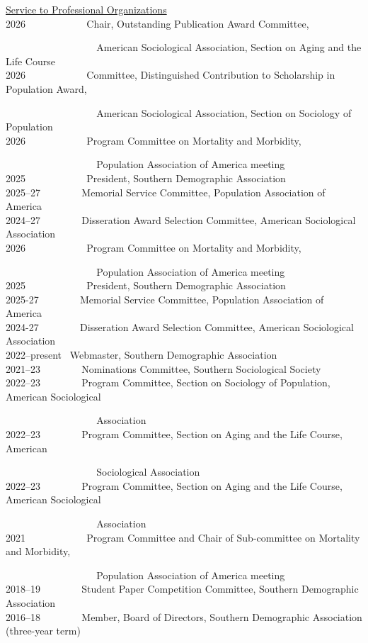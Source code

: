 \documentclass[11pt,]{article}
\begin{document}
\underline{Service to Professional Organizations}\\
2026 ~ ~ ~ ~ ~ ~ ~ Chair, Outstanding Publication Award Committee,\\
\strut ~ ~ ~ ~ ~ ~ ~ ~ ~ ~ ~ American Sociological Association, Section
on Aging and the Life Course\\
2026 ~ ~ ~ ~ ~ ~ ~ Committee, Distinguished Contribution to Scholarship
in Population Award,\\
\strut ~ ~ ~ ~ ~ ~ ~ ~ ~ ~ ~ American Sociological Association, Section
on Sociology of Population\\
2026 ~ ~ ~ ~ ~ ~ ~ Program Committee on Mortality and Morbidity,\\
\strut ~ ~ ~ ~ ~ ~ ~ ~ ~ ~ ~ Population Association of America meeting\\
2025 ~ ~ ~ ~ ~ ~ ~ President, Southern Demographic Association\\
2025--27 ~ ~ ~ ~ ~Memorial Service Committee, Population Association of
America\\
2024--27 ~ ~ ~ ~ ~Disseration Award Selection Committee, American
Sociological Association\\
2026 ~ ~ ~ ~ ~ ~ ~ Program Committee on Mortality and Morbidity,\\
\strut ~ ~ ~ ~ ~ ~ ~ ~ ~ ~ ~ Population Association of America meeting\\
2025 ~ ~ ~ ~ ~ ~ ~ President, Southern Demographic Association\\
2025-27 ~ ~ ~ ~ ~Memorial Service Committee, Population Association of
America\\
2024-27 ~ ~ ~ ~ ~Disseration Award Selection Committee, American
Sociological Association\\
2022--present ~Webmaster, Southern Demographic Association\\
2021--23 ~ ~ ~ ~ ~Nominations Committee, Southern Sociological Society\\
2022--23 ~ ~ ~ ~ ~Program Committee, Section on Sociology of Population,
American Sociological\\
\strut ~ ~ ~ ~ ~ ~ ~ ~ ~ ~ ~ Association\\
2022--23 ~ ~ ~ ~ ~Program Committee, Section on Aging and the Life
Course, American\\
\strut ~ ~ ~ ~ ~ ~ ~ ~ ~ ~ ~ Sociological Association\\
2022--23 ~ ~ ~ ~ ~Program Committee, Section on Aging and the Life
Course, American Sociological\\
\strut ~ ~ ~ ~ ~ ~ ~ ~ ~ ~ ~ Association\\
2021 ~ ~ ~ ~ ~ ~ ~ Program Committee and Chair of Sub-committee on
Mortality and Morbidity,\\
\strut ~ ~ ~ ~ ~ ~ ~ ~ ~ ~ ~ Population Association of America meeting\\
2018--19 ~ ~ ~ ~ ~Student Paper Competition Committee, Southern
Demographic Association\\
2016--18 ~ ~ ~ ~ ~Member, Board of Directors, Southern Demographic
Association (three-year term)
\end{document}
